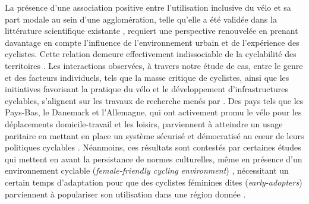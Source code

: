 \begin{refsegment}
La présence d'une association positive entre l'utilisation inclusive du vélo et sa part modale au sein d'une agglomération, telle qu'elle a été validée dans la littérature scientifique existante \textcolor{blue}{\autocites[70]{goel_cycling_2022}[63]{garrard_revolutions_2006}}, requiert une perspective renouvelée en prenant davantage en compte l'influence de l'environnement urbain et de l'expérience des cyclistes. Cette relation demeure effectivement indissociable de la cyclabilité des territoires \textcolor{blue}{\autocite{garrard_women_2021}}. Les interactions observées, à travers notre étude de cas, entre le genre et des facteurs individuels, tels que la masse critique de cyclistes, ainsi que les initiatives favorisant la pratique du vélo et le développement d'infrastructures cyclables, s'alignent sur les travaux de recherche menés par \textcolor{blue}{\textcite[513]{garrard_women_2012}}. Des pays tels que les Pays-Bas, le Danemark et l'Allemagne, qui ont activement promu le vélo pour les déplacements domicile-travail et les loisirs, parviennent à atteindre un usage paritaire en mettant en place un système sécurisé et démocratisé au cœur de leurs politiques cyclables \textcolor{blue}{\autocite[79]{nelson_if_1997}}. Néanmoins, ces résultats sont contestés par certaines études qui mettent en avant la persistance de normes culturelles, même en présence d'un environnement cyclable  (\textsl{female-friendly cycling environment}) \textcolor{blue}{\autocites[8]{aldred_why_2014}[40]{aldred_does_2016}}, nécessitant un certain temps d'adaptation pour que des cyclistes féminines dites  (\textsl{early-adopters}) parviennent à populariser son utilisation dans une région donnée \textcolor{blue}{\autocites[8]{aldred_why_2014}[40]{aldred_does_2016}}.%


\end{refsegment}
